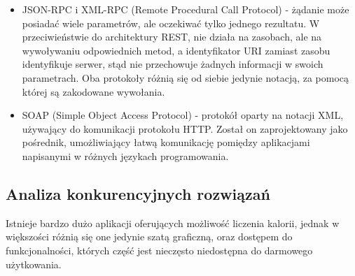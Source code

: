 \documentclass[12pt, a4paper]{article}
\begin{document}
\begin{sloppypar}
{{\begin{itemize}
\begin{itemize}
        Najczęściej używanym formatem wymiany danych jest notacja JSON.
        \item Interfejsy API REST korzystają z ujednoliconego interfejsu, co ułatwia 
        rozdzielenie implementacji klienta od implementacji usługi.
        \item Interfejsy API REST korzystają z bezstanowego modelu żądań. Żądania HTTP 
        powinny być niezależne i mogą występować w dowolnej kolejności, dlatego 
        zachowywanie informacji o stanie przejściowym między żądaniami nie jest możliwe.
        Informacje są przechowywane jedynie w zasobach, a każde żądanie powinno być 
        niepodzielną operacją.
        \item Interfejsy API REST są sterowane za pomocą hipermedialnych linków, 
        zawartych w reprezentacji.
      \end{itemize}
      \item JSON-RPC i XML-RPC (Remote Procedural Call Protocol) - żądanie może posiadać
      wiele parametrów, ale oczekiwać tylko jednego rezultatu. W przeciwieństwie do 
      architektury REST, nie działa na zasobach, ale na wywoływaniu odpowiednich metod,
      a identyfikator URI zamiast zasobu identyfikuje serwer, stąd nie przechowuje żadnych
      informacji w swoich parametrach. Oba protokoły różnią się od siebie jedynie notacją,
      za pomocą której są zakodowane wywołania.
      \item SOAP (Simple Object Access Protocol) - protokół oparty na notacji XML, używający
      do komunikacji protokołu HTTP. Został on zaprojektowany jako pośrednik, umożliwiający
      łatwą komunikację pomiędzy aplikacjami napisanymi w różnych językach programowania.
    \end{itemize} 
  }
  \subsection{Analiza konkurencyjnych rozwiązań}
  {
    Istnieje bardzo dużo aplikacji oferujących możliwość liczenia kalorii, jednak w 
    większości różnią się one jedynie szatą graficzną, oraz dostępem do funkcjonalności,
    których część jest nieczęsto niedostępna do darmowego użytkowania.
}}
\end{sloppypar}
\end{document}
